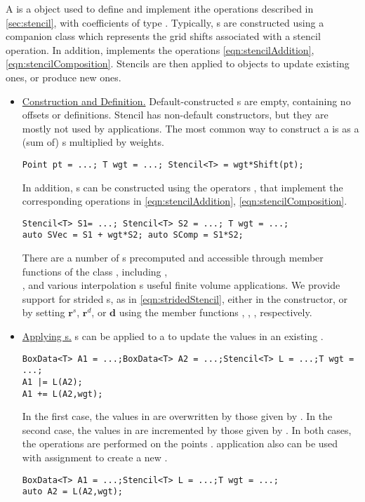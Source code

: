 \documentclass[12pt]{article}
\newcommand{\Stencil}{\code{Stencil}}
\newcommand{\BoxData}{\code{BoxData} }
\begin{document}
A  is a object used to define and implement ithe operations described in \ref{sec:stencil}, with coefficients of type . Typically, s are constructed using a companion class  which represents the grid shifts associated with a stencil operation. In addition,  implements the operations \eqref{eqn:stencilAddition}, \eqref{eqn:stencilComposition}. Stencils are then applied to  objects to update existing ones, or produce new ones.

\begin{itemize}
\item
\underline{Construction and Definition.}
Default-constructed s are empty, containing no offsets or definitions. 
Stencil has non-default constructors, but they are mostly not used by applications. The most common way to construct a  is as a (sum of) s multiplied by weights.
\begin{verbatim}
Point pt = ...; T wgt = ...; Stencil<T> = wgt*Shift(pt);
\end{verbatim}
In addition, \Stencil s can be constructed using the operators \code{+}, \code{*} that implement the corresponding operations in \eqref{eqn:stencilAddition}, \eqref{eqn:stencilComposition}.
\begin{verbatim}
Stencil<T> S1= ...; Stencil<T> S2 = ...; T wgt = ...;
auto SVec = S1 + wgt*S2; auto SComp = S1*S2;
\end{verbatim}
There are a number of s precomputed and accessible through member functions of the class , including , \\ , and various interpolation s useful finite volume applications. 
We provide support for strided s, as in \eqref{eqn:stridedStencil}, either in the constructor, or by setting $\boldsymbol{r}^s$, $\boldsymbol{r}^d$, or $\boldsymbol{d}$ using the member functions , , , respectively.
\item
\underline{Applying \Stencil s.}
\Stencil s can be applied to a \BoxData  to update the values in an existing \BoxData .
\begin{verbatim}
BoxData<T> A1 = ...;BoxData<T> A2 = ...;Stencil<T> L = ...;T wgt = ...;
A1 |= L(A2);
A1 += L(A2,wgt);
\end{verbatim}
In the first case, the values in  are overwritten by those given by .  In the second case, the values in  are incremented by those given by . In both cases, the operations are performed on the points . 
 application also can be used with assignment to create a new \BoxData.
\begin{verbatim}
BoxData<T> A1 = ...;Stencil<T> L = ...;T wgt = ...;
auto A2 = L(A2,wgt);
\end{verbatim}
\end{itemize} 
\end{document}
